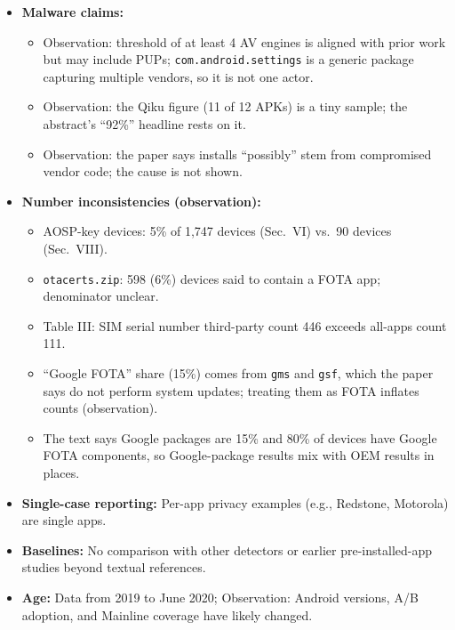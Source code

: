\documentclass[11pt,a4paper]{article}
\begin{document}
\begin{enumerate}
\begin{itemize}[leftmargin=*,itemsep=1pt,topsep=2pt]
        \item \textbf{Malware claims:}
        \begin{itemize}[itemsep=0pt]
            \item Observation: threshold of at least 4 AV engines is aligned with prior work but may include PUPs; \texttt{com.android.settings} is a generic package capturing multiple vendors, so it is not one actor.
            \item Observation: the Qiku figure (11 of 12 APKs) is a tiny sample; the abstract's ``92\%'' headline rests on it.
            \item Observation: the paper says installs ``possibly'' stem from compromised vendor code; the cause is not shown.
        \end{itemize}
        \item \textbf{Number inconsistencies (observation):}
        \begin{itemize}[itemsep=0pt]
            \item AOSP-key devices: 5\% of 1,747 devices (Sec.~VI) vs.\ 90 devices (Sec.~VIII).
            \item \texttt{otacerts.zip}: 598 (6\%) devices said to contain a FOTA app; denominator unclear.
            \item Table III: SIM serial number third-party count 446 exceeds all-apps count 111.
            \item ``Google FOTA'' share (15\%) comes from \texttt{gms} and \texttt{gsf}, which the paper says do not perform system updates; treating them as FOTA inflates counts (observation).
            \item The text says Google packages are 15\% and 80\% of devices have Google FOTA components, so Google-package results mix with OEM results in places.
        \end{itemize}
        \item \textbf{Single-case reporting:} Per-app privacy examples (e.g., Redstone, Motorola) are single apps.
        \item \textbf{Baselines:} No comparison with other detectors or earlier pre-installed-app studies beyond textual references.
        \item \textbf{Age:} Data from 2019 to June 2020; Observation: Android versions, A/B adoption, and Mainline coverage have likely changed.
    \end{itemize}


\end{enumerate}
\end{document}

